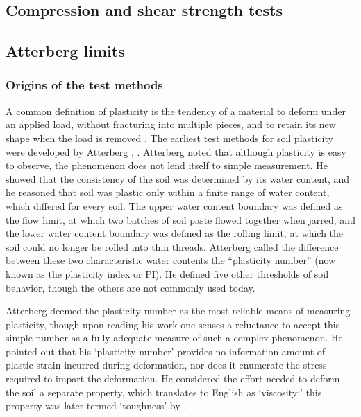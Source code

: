 \documentclass[
]{book}
\begin{document}
\hypertarget{compression-and-shear-strength-tests}{%
\subsection{Compression and shear strength tests}\label{compression-and-shear-strength-tests}}

\hypertarget{atterberg-limits}{%
\subsection{Atterberg limits}\label{atterberg-limits}}

\hypertarget{origins-of-the-test-methods}{%
\subsubsection{Origins of the test methods}\label{origins-of-the-test-methods}}

A common definition of plasticity is the tendency of a material to deform under an applied load, without fracturing into multiple pieces, and to retain its new shape when the load is removed \citep{Andrade2011} . The earliest test methods for soil plasticity were developed by Atterberg \citeyearpar{Atterberg1911}, \citeyearpar{Atterberg1974}. Atterberg noted that although plasticity is easy to observe, the phenomenon does not lend itself to simple measurement. He showed that the consistency of the soil was determined by its water content, and he reasoned that soil was plastic only within a finite range of water content, which differed for every soil. The upper water content boundary was defined as the flow limit, at which two batches of soil paste flowed together when jarred, and the lower water content boundary was defined as the rolling limit, at which the soil could no longer be rolled into thin threads. Atterberg called the difference between these two characteristic water contents the ``plasticity number'' (now known as the plasticity index or PI). He defined five other thresholds of soil behavior, though the others are not commonly used today.

Atterberg deemed the plasticity number as the most reliable means of measuring plasticity, though upon reading his work one senses a reluctance to accept this simple number as a fully adequate measure of such a complex phenomenon. He pointed out that his `plasticity number' provides no information amount of plastic strain incurred during deformation, nor does it enumerate the stress required to impart the deformation. He considered the effort needed to deform the soil a separate property, which translates to English as `viscosity;' this property was later termed `toughness' by \citet{Casagrande1932}.
\end{document}
